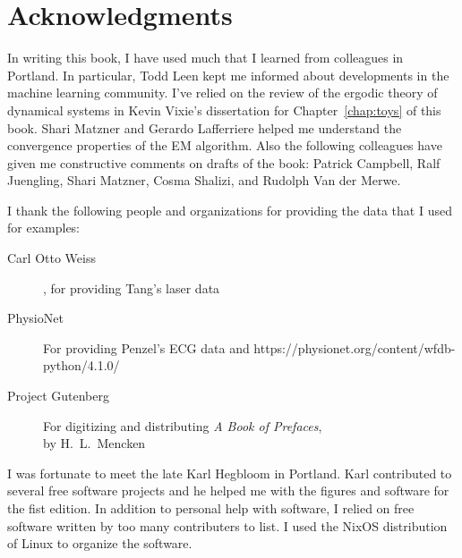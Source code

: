 \documentclass[ltxbook,showlabels]{hmmdsbook}
\begin{document}
\section*{Acknowledgments}
%
\label{sec:ack}
\longpage%

In writing this book, I have used much that I learned from colleagues
in Portland.  In particular, Todd Leen kept me informed about
developments in the machine learning community.  I've relied on the
review of the ergodic theory of dynamical systems in Kevin Vixie's
dissertation\cite{vixie02} for Chapter~\ref{chap:toys} of this book.
Shari Matzner and Gerardo Lafferriere helped me understand the
convergence properties of the EM algorithm.  Also the following
colleagues have given me constructive comments on drafts of the book:
% 
Patrick Campbell, %
Ralf Juengling, %
Shari Matzner, %
Cosma Shalizi, %
and %
Rudolph Van der Merwe. %

I thank the following people and organizations for providing the data
that I used for examples:
\begin{description}
\item[Carl Otto Weiss], for providing Tang's\cite{Tang92} laser data
\item[PhysioNet] For providing Penzel's\cite{Penzel02} ECG data and
  https://physionet.org/content/wfdb-python/4.1.0/ \cite{PhysioToolkit}
\item[Project Gutenberg] For digitizing and distributing \emph{A
    Book of Prefaces},\\ by H.~L.~Mencken
\end{description}

I was fortunate to meet the late Karl Hegbloom in Portland.  Karl
contributed to several free software projects and he helped me with
the figures and software for the fist edition.  In addition to
personal help with software, I relied on free software written by too
many contributers to list.  I used the NixOS distribution of Linux to
organize the software.
\end{document}
